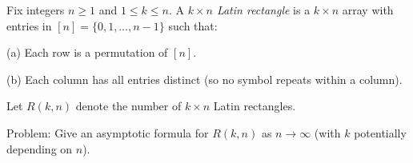 Fix integers $n\ge 1$ and $1\le k\le n$.
A \emph{$k\times n$ Latin rectangle} is a $k\times n$ array with entries in $[n]=\{0,1,\dots,n-1\}$ such that:

(a) Each row is a permutation of $[n]$.

(b) Each column has all entries distinct (so no symbol repeats within a column).

Let $R(k,n)$ denote the number of $k\times n$ Latin rectangles.

Problem: Give an asymptotic formula for $R(k,n)$ as $n\to\infty$ (with $k$ potentially depending on $n$).
